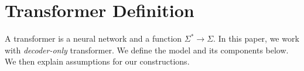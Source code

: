 



\section{Transformer Definition} \label{sec:transformer def}

A transformer is a neural network and a function $\Sigma^* \to \Sigma$. In this paper, we work with \textit{decoder-only} transformer. We define the model and its components below. We then explain assumptions for our constructions. 

